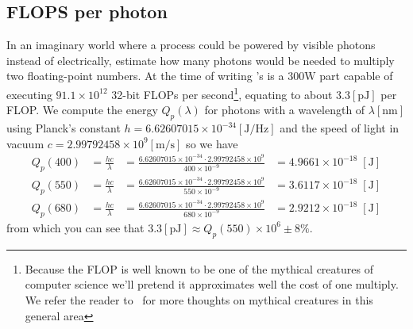\subsection{FLOPS per photon}\label{sec:energy_photon}

In an imaginary world where a process could be powered by visible photons instead of electrically,
estimate how many photons would be needed to multiply two floating-point numbers.
At the time of writing 's   is a 
$300 \unit{\watt}$ part capable of executing $91.1 \times 10^{12}$ 32-bit \glspl{FLOP} per 
second\footnote{
	Because the \gls{FLOP} is well known to be one of the mythical creatures of computer 
	science we'll pretend it approximates well the cost of one multiply.
	We refer the reader to~\cite{brooks95} for more thoughts on mythical creatures in this 
	general area},
equating to about $3.3 [\unit{\pico\joule}]$ per \gls{FLOP}.
We compute the energy $Q_p(\lambda)$ for photons with a wavelength of $\lambda [\unit{\nano\meter}]$ 
using Planck's constant $h = 6.62607015 \times 10^{-34} [\unit{\joule\per\hertz}]$ 
and the speed of light in vacuum $c = 2.99792458 \times 10^{9}[\unit{\meter\per\second}]$ so we have
\begin{align}
	Q_p(400) &= \frac{hc}{\lambda} 
		&= \frac{6.62607015 \times 10^{-34} \cdot 2.99792458 \times 10^{9}}{400\times 10^{-9}}
	 	&= 4.9661 \times 10^{-18}\;[\unit{\joule}] \\
	Q_p(550) &= \frac{hc}{\lambda} 
		&= \frac{6.62607015 \times 10^{-34} \cdot 2.99792458 \times 10^{9}}{550\times 10^{-9}}
	 	&= 3.6117 \times 10^{-18}\;[\unit{\joule}] \\
	Q_p(680) &= \frac{hc}{\lambda} 
		&= \frac{6.62607015 \times 10^{-34} \cdot 2.99792458 \times 10^{9}}{680\times 10^{-9}}
	 	&= 2.9212 \times 10^{-18}\;[\unit{\joule}]
\end{align}
from which you can see that $3.3 [\unit{\pico\joule}] \approx Q_p(550) \times 10^{6} \pm 8\%$.



